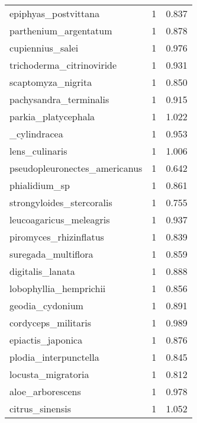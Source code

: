 \begin{tabular}{lrr}
           epiphyas\_postvittana &                   1 &     0.837 \\
          parthenium\_argentatum &                   1 &     0.878 \\
               cupiennius\_salei &                   1 &     0.976 \\
      trichoderma\_citrinoviride &                   1 &     0.931 \\
             scaptomyza\_nigrita &                   1 &     0.850 \\
         pachysandra\_terminalis &                   1 &     0.915 \\
            parkia\_platycephala &                   1 &     1.022 \\
          [candida]\_cylindracea &                   1 &     0.953 \\
                 lens\_culinaris &                   1 &     1.006 \\
  pseudopleuronectes\_americanus &                   1 &     0.642 \\
                  phialidium\_sp &                   1 &     0.861 \\
      strongyloides\_stercoralis &                   1 &     0.755 \\
        leucoagaricus\_meleagris &                   1 &     0.937 \\
         piromyces\_rhizinflatus &                   1 &     0.839 \\
            suregada\_multiflora &                   1 &     0.859 \\
               digitalis\_lanata &                   1 &     0.888 \\
         lobophyllia\_hemprichii &                   1 &     0.856 \\
                geodia\_cydonium &                   1 &     0.891 \\
            cordyceps\_militaris &                   1 &     0.989 \\
              epiactis\_japonica &                   1 &     0.876 \\
          plodia\_interpunctella &                   1 &     0.845 \\
             locusta\_migratoria &                   1 &     0.812 \\
               aloe\_arborescens &                   1 &     0.978 \\
                citrus\_sinensis &                   1 &     1.052 \\

\end{tabular}
